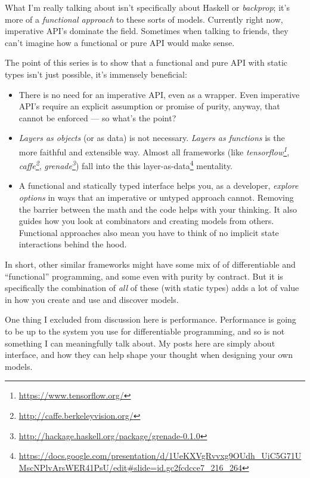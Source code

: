 \documentclass[]{article}
\renewcommand{\href}[2]{#2\footnote{\url{#1}}}
\begin{document}
What I'm really talking about isn't specifically about Haskell or
\emph{backprop}; it's more of a \emph{functional approach} to these sorts of
models. Currently right now, imperative API's dominate the field. Sometimes when
talking to friends, they can't imagine how a functional or pure API would make
sense.

The point of this series is to show that a functional and pure API with static
types isn't just possible, it's immensely beneficial:

\begin{itemize}
\tightlist
\item
  There is no need for an imperative API, even as a wrapper. Even imperative
  API's require an explicit assumption or promise of purity, anyway, that cannot
  be enforced --- so what's the point?
\item
  \emph{Layers as objects} (or as data) is not necessary. \emph{Layers as
  functions} is the more faithful and extensible way. Almost all frameworks
  (like \emph{\href{https://www.tensorflow.org/}{tensorflow}},
  \emph{\href{http://caffe.berkeleyvision.org/}{caffe}},
  \emph{\href{http://hackage.haskell.org/package/grenade-0.1.0}{grenade}}) fall
  into the this
  \href{https://docs.google.com/presentation/d/1UeKXVgRvvxg9OUdh_UiC5G71UMscNPlvArsWER41PsU/edit\#slide=id.gc2fcdcce7_216_264}{layer-as-data}
  mentality.
\item
  A functional and statically typed interface helps you, as a developer,
  \emph{explore options} in ways that an imperative or untyped approach cannot.
  Removing the barrier between the math and the code helps with your thinking.
  It also guides how you look at combinators and creating models from others.
  Functional approaches also mean you have to think of no implicit state
  interactions behind the hood.
\end{itemize}

In short, other similar frameworks might have some mix of of differentiable and
``functional'' programming, and some even with purity by contract. But it is
specifically the combination of \emph{all} of these (with static types) adds a
lot of value in how you create and use and discover models.

One thing I excluded from discussion here is performance. Performance is going
to be up to the system you use for differentiable programming, and so is not
something I can meaningfully talk about. My posts here are simply about
interface, and how they can help shape your thought when designing your own
models.
\end{document}

